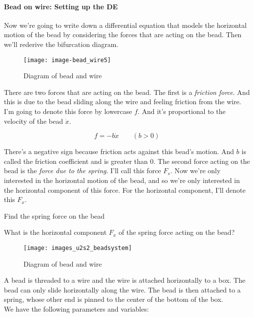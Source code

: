 \clearpage 

\paragraph{Bead on wire: Setting up the DE}
Now we're going to write down a differential equation that
models the horizontal motion of the bead
by considering the forces that are acting on the bead.
Then we'll rederive the bifurcation diagram.

\begin{wrapfigure}{r}{4cm}
  \texttt{[image: image-bead\_wire5]}
  \caption{Diagram of bead and wire}
\end{wrapfigure}

There are two forces that are acting on the bead.
The first is a \emph{friction force}.
And this is due to the bead sliding along the wire
and feeling friction from the wire.
I'm going to denote this force by lowercase $f$.
And it's proportional to the velocity of the bead $\dot x$.

\begin{equation*}
  f = -b \dot x \qquad (b > 0)
\end{equation*}

There's a negative sign because friction acts against this bead's motion.
And $b$ is called the friction coefficient and is greater than $0$.
The second force acting on the bead is the \emph{force due to the spring}.
I'll call this force $F_ s$.
Now we're only interested in the horizontal motion of the bead,
and so we're only interested in the horizontal component
of this force.
For the horizontal component, I'll denote this $F_x$.
\begin{exercise}
  Find the spring force on the bead
\end{exercise}

What is the horizontal component $F_x$ of the spring force acting on the bead?
\begin{figure}[ht!]
  \centering
  \texttt{[image: images\_u2s2\_beadsystem]}
  \caption{Diagram of bead and wire}
\end{figure}

A bead is threaded to a wire and the wire is attached horizontally to a box.
The bead can only slide horizontally along the wire.
The bead is then attached to a spring, whose other end is pinned to the center of the bottom of the box.\\

We have the following parameters and variables:


